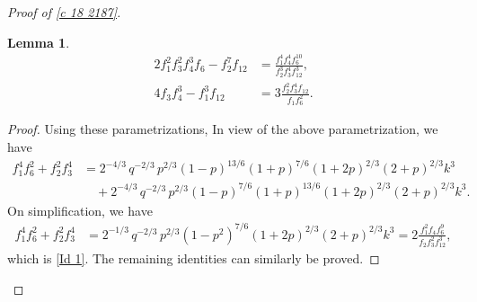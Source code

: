 \documentclass[12pt]{article}
\numberwithin{equation}{section}
\theoremstyle{plain}
\numberwithin{theorem}{section}
\newtheorem{lemma}[theorem]{Lemma}
\theoremstyle{definition}
\theoremstyle{remark}
\begin{document}
\begin{proof}[Proof of \eqref{c 18 2187}]
\begin{lemma}
\begin{align}
            2 f_1^2 f_3^2 f_4^3 f_6-f_2^7 f_{12}&=\frac{f_1^4 f_4^4 f_6^{10}}{f_2^3 f_3^4 f_{12}^3}, \label{Id 8}\\
            4 f_3 f_4^3-f_1^3 f_{12}&=3\frac{f_2^2 f_3^4 f_{12}}{f_1 f_6^2}. \label{Id 9}
        \end{align}
    \end{lemma}
    \begin{proof}
        Using these parametrizations,
    In view of the above parametrization, we have
    \begin{align*}
        f_1^4f_6^2+f_2^2 f_3^4&=2^{-4/3} \, q^{-2/3} \, p^{2/3} (1 - p)^{13/6} (1+p)^{7/6} (1+2p)^{2/3} (2+p)^{2/3} k^3\\
        &\quad+ 2^{-4/3} \, q^{-2/3} \, p^{2/3} (1 - p)^{7/6} (1+p)^{13/6} (1+2p)^{2/3} (2+p)^{2/3} k^3.
    \end{align*}
    On simplification, we have
    \begin{align*}
        f_1^4f_6^2+f_2^2 f_3^4&=2^{-1/3} \, q^{-2/3} \, p^{2/3} (1 - p^2)^{7/6} (1+2p)^{2/3} (2+p)^{2/3} k^3=2 \frac{f_1^2 f_4 f_6^9}{f_2 f_3^2 f_{12}^3},
    \end{align*}
    which is \eqref{Id 1}. The remaining identities can similarly be proved.
    \end{proof}
    

\end{proof}
\end{document}
